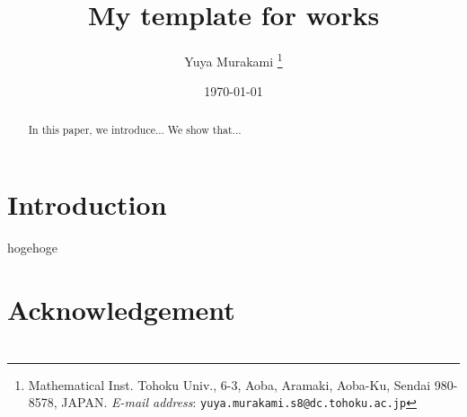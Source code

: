 \documentclass[11pt,a4paper,oneside,lualatex]{article}
\begin{document}

\title{My template for works}
\author{Yuya Murakami
\thanks{Mathematical Inst. Tohoku Univ., 6-3, Aoba, Aramaki, Aoba-Ku, Sendai 980-8578, JAPAN.
	\textit{E-mail address}: \texttt{yuya.murakami.s8@dc.tohoku.ac.jp}}}
\date{\today}

\maketitle


\begin{abstract}
	In this paper, we introduce...
	We show that...
\end{abstract}


\tableofcontents


\section{Introduction} \label{sec:intro}


\begin{thm} \label{thm:main}
	hogehoge
\end{thm}



\section*{Acknowledgement} \label{sec:acknowledgement}




\section{} \label{sec:}





%
%

\end{document}
